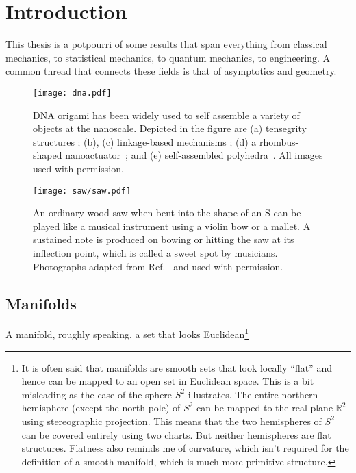 
\chapter{Introduction}

This thesis is a potpourri of some results that span everything from classical mechanics, to statistical mechanics, to quantum mechanics, to engineering.
A common thread that connects these fields is that of asymptotics and geometry.

\begin{figure}
  \begin{center}
    \texttt{[image: dna.pdf]}
  \end{center}
  \caption{DNA origami has been widely used to self assemble a variety of objects at the nanoscale.
    Depicted in the figure are (a) tensegrity structures \cite{liedl2010}; (b), (c) linkage-based mechanisms \cite{marras2015,zhou2015}; (d) a rhombus-shaped nanoactuator~\cite{ke2016}; and (e) self-assembled polyhedra~\cite{iinuma2014}.  All images used with permission.}
  \label{fig:}
\end{figure}

\begin{figure}
  \begin{center}
    \texttt{[image: saw/saw.pdf]}
  \end{center}
  \caption{%
    An ordinary wood saw when bent into the shape of an S can be played like a musical instrument using a violin bow or a mallet.
    A sustained note is produced on bowing or hitting the saw at its inflection point, which is called a sweet spot by musicians.
    Photographs adapted from Ref.~\cite{shankar2022} and used with permission.
  }
  \label{fig:saw}
\end{figure}


\section{Manifolds}

A manifold, roughly speaking, a set that looks Euclidean\footnote{It is often said that manifolds are smooth sets that look locally ``flat'' and hence can be mapped to an open set in Euclidean space.
This is a bit misleading as the case of the sphere $S^2$ illustrates.
The entire northern hemisphere (except the north pole) of $S^2$ can be mapped to the real plane $\mathbb{R}^{2}$ using stereographic projection.
This means that the two hemispheres of $S^2$ can be covered entirely using two charts.
But neither hemispheres are flat structures.
Flatness also reminds me of curvature, which isn't required for the definition of a smooth manifold, which is much more primitive structure.}

